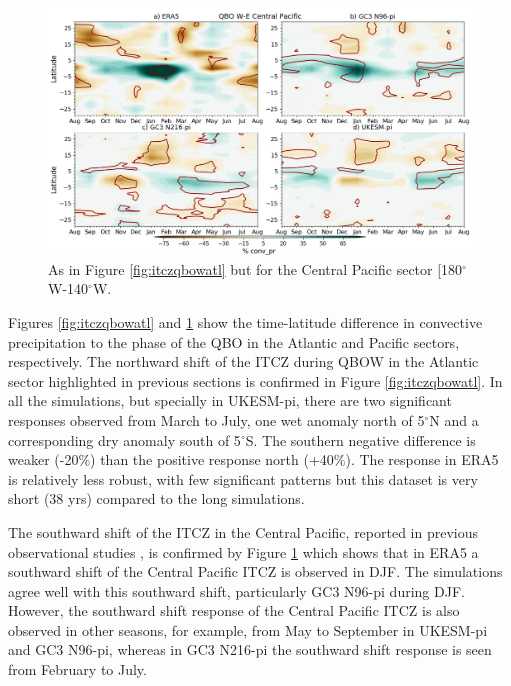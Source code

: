 \begin{figure}[t!]
\centering
 \includegraphics[width=\linewidth]{figures/anomcmip_conv_prcpqbow.png}
\caption[Central Pacific ITCZ convective precipitation differences on QBO phase.]{As in Figure \ref{fig:itczqbowatl} but for the Central Pacific sector [180$^\circ$W-140$^\circ$W.}
\label{fig:itczqbowcp}
\end{figure}

Figures \ref{fig:itczqbowatl} and \ref{fig:itczqbowcp} show the time-latitude difference in convective precipitation to the phase of the QBO in the Atlantic and Pacific sectors, respectively. 
The northward shift of the ITCZ during QBOW in the Atlantic sector highlighted in previous sections is confirmed in Figure \ref{fig:itczqbowatl}. In all the simulations, but specially in UKESM-pi, there are two significant responses observed from March to July, one wet anomaly north of 5$^\circ$N and a corresponding dry anomaly south of 5$^\circ$S. The southern negative difference is weaker (-20\%) than the positive response north (+40\%). 
The response in ERA5 is relatively less robust, with few significant patterns but this dataset is very short (38 yrs) compared to the long simulations. %

The southward shift of the ITCZ in the Central Pacific, reported in previous observational studies \citep{gray2018}, is confirmed by Figure \ref{fig:itczqbowcp} which shows that in ERA5 a southward shift of the Central Pacific ITCZ is observed in DJF. 
The simulations agree well with this southward shift, particularly GC3 N96-pi during DJF. However, the southward shift response of the Central Pacific ITCZ is also observed in other seasons, for example, from May to September in UKESM-pi and GC3 N96-pi, whereas in GC3 N216-pi the southward shift response is seen from February to July.


